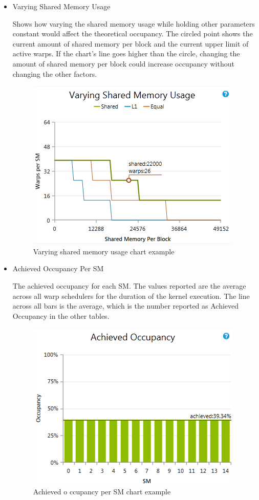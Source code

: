 \documentclass[oneside,openright,12pt,final,en]{mgr}
\begin{document}
\begin{itemize}
	\item Varying Shared Memory Usage

	Shows how varying the shared memory usage while holding other parameters constant would affect the theoretical occupancy. The circled point shows the current amount of shared memory per block and the current upper limit of active warps. If the chart's line goes higher than the circle, changing the amount of shared memory per block could increase occupancy without changing the other factors.
	
	\begin{figure}[h!]
		\centering
		\includegraphics{AchievedOccupancyVaryingSharedMemoryUsage}
		\caption{Varying shared memory usage chart example}
	\end{figure}

	\item Achieved Occupancy Per SM
	
	The achieved occupancy for each SM. The values reported are the average across all warp schedulers for the duration of the kernel execution. The line across all bars is the average, which is the number reported as Achieved Occupancy in the other tables.

	\begin{figure}[h!]
		\centering
		\includegraphics{AchievedOccupancyPerSm}
		\caption{Achieved o ccupancy per SM chart example}
	\end{figure}

\end{itemize}
\end{document}
